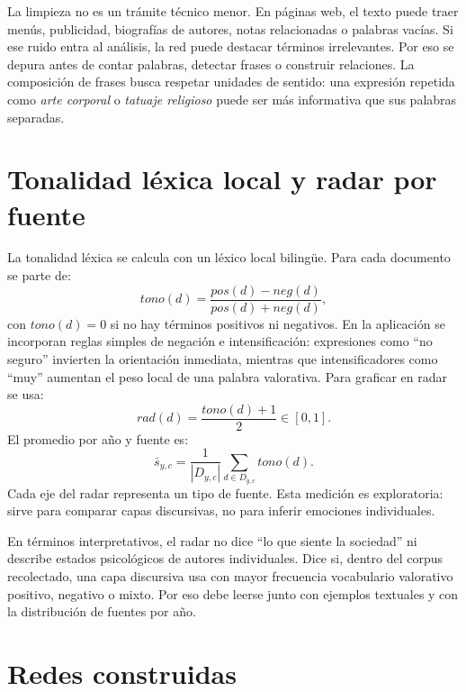 \documentclass[11pt]{article}
\begin{document}
La limpieza no es un trámite técnico menor. En páginas web, el texto puede traer
menús, publicidad, biografías de autores, notas relacionadas o palabras vacías.
Si ese ruido entra al análisis, la red puede destacar términos irrelevantes. Por
eso se depura antes de contar palabras, detectar frases o construir relaciones.
La composición de frases busca respetar unidades de sentido: una expresión
repetida como \textit{arte corporal} o \textit{tatuaje religioso} puede ser más
informativa que sus palabras separadas.

\section{Tonalidad léxica local y radar por fuente}

La tonalidad léxica se calcula con un léxico local bilingüe. Para cada documento
se parte de:
\[
tono(d)=
\frac{pos(d)-neg(d)}{pos(d)+neg(d)},
\]
con \(tono(d)=0\) si no hay términos positivos ni negativos. En la aplicación
se incorporan reglas simples de negación e intensificación: expresiones como
``no seguro'' invierten la orientación inmediata, mientras que intensificadores
como ``muy'' aumentan el peso local de una palabra valorativa. Para graficar en
radar se usa:
\[
rad(d)=\frac{tono(d)+1}{2}\in[0,1].
\]
El promedio por año y fuente es:
\[
\bar{s}_{y,c}=
\frac{1}{|D_{y,c}|}\sum_{d\in D_{y,c}}tono(d).
\]
Cada eje del radar representa un tipo de fuente. Esta medición es exploratoria:
sirve para comparar capas discursivas, no para inferir emociones individuales.

En términos interpretativos, el radar no dice ``lo que siente la sociedad'' ni
describe estados psicológicos de autores individuales. Dice si, dentro del
corpus recolectado, una capa discursiva usa con mayor frecuencia vocabulario
valorativo positivo, negativo o mixto. Por eso debe leerse junto con ejemplos
textuales y con la distribución de fuentes por año.

\section{Redes construidas}
\end{document}
